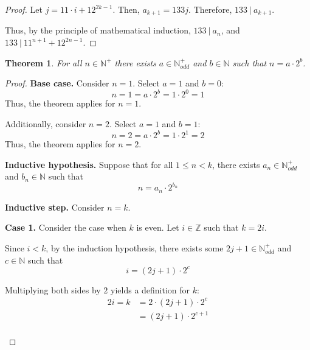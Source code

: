 \documentclass{article}
\newtheorem{theorem}{Theorem}
\numberwithin{subcase}{case}
\begin{document}
\begin{outline}[enumerate]
\begin{proof}
        Let $j=11 \cdot i + 12^{2k-1}$. Then, $a_{k+1} = 133j$. Therefore, $133\ |\ a_{k+1}$.

        Thus, by the principle of mathematical induction, $133\ |\ a_n$, and $133\ |\ 11^{n+1} + 12^{2n-1}$.

    \end{proof}

    \1 \begin{theorem}
        For all $n \in \mathbb{N}^+$ there exists $a \in \mathbb{N}^+_{odd}$ and $b \in \mathbb{N}$ such that $n = a\cdot 2^b$.
    \end{theorem}

    \begin{proof}
        \textbf{Base case.} Consider $n = 1$. Select $a = 1$ and $b = 0$: 
        \begin{equation}
            n = 1 = a\cdot 2^b = 1 \cdot 2^0 = 1
        \end{equation}
        Thus, the theorem applies for $n = 1$.

        Additionally, consider $n = 2$. Select $a = 1$ and $b = 1$: 
        \begin{equation}
            n = 2 = a\cdot 2^b = 1 \cdot 2^1 = 2
        \end{equation}
        Thus, the theorem applies for $n = 2$.

        \textbf{Inductive hypothesis.} Suppose that for all $1 \leq n < k$, there exists $a_n \in \mathbb{N}^+_{odd}$ and $b_n \in \mathbb{N}$ such that 
        \begin{equation}
            n = a_n \cdot 2^{b_n}
            \label{eqn:a2b-ih}            
        \end{equation}

        \textbf{Inductive step.} Consider $n = k$. 

        \begin{adjustwidth}{0.5cm}{0cm}
            
            \textbf{Case 1.} Consider the case when $k$ is even. Let $i \in \mathbb{Z}$ such that $k = 2i$.

            Since $i < k$, by the induction hypothesis, there exists some $2j + 1 \in \mathbb{N}^+_{odd}$ 
            and $c \in \mathbb{N}$ such that
            \begin{equation}
                i = (2j+1) \cdot 2^c
                \label{eqn:a2b-odd-ev-ih}
            \end{equation}

            Multiplying both sides by $2$ yields a definition for $k$:
            \begin{equation}
                \begin{aligned}                
                    2i = k &= 2\cdot (2j+1) \cdot 2^c \\
                    &= (2j+1) \cdot 2^{c + 1} \\
                \end{aligned}
                \label{eqn:a2b-post-ih}
            \end{equation}


\end{adjustwidth}
\end{proof}
\end{outline}
\end{document}
